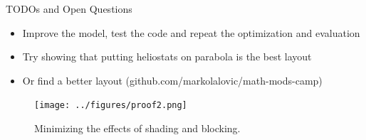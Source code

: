\documentclass[10pt, xcolor={dvipsnames}]{beamer}
\begin{document}
\begin{frame}{TODOs and Open Questions}
\begin{itemize}
\item Improve the model, test the code and repeat the optimization and evaluation
\item Try showing that putting heliostats on parabola is the best layout
\item Or find a better layout (github.com/markolalovic/math-mods-camp)
\end{itemize}

\begin{center}
\begin{figure}[H]
\texttt{[image: ../figures/proof2.png]}
\caption{Minimizing the effects of shading and blocking.}
\end{figure}
\end{center}

\end{frame}
\end{document}
